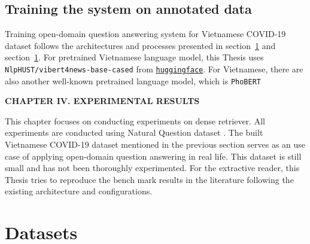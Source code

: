 \documentclass[3p, sort&compress, 12pt]{elsarticle}
\begin{document}
\subsection{Training the system on annotated data}
Training open-domain question answering system for Vietnamese COVID-19 dataset follows the architectures and processes presented in section~\ref{} and section~\ref{}. For pretrained Vietnamese language model, this Thesis uses {\tt NlpHUST/vibert4news-base-cased} from \href{https://huggingface.co/}{\tt huggingface}. For Vietnamese, there are also another well-known pretrained language model, which is {\tt PhoBERT} \cite{nguyen2020phobert}
\newpage
\begin{center}
	\fontsize{20}{\baselineskip}\selectfont\sf\bfseries CHAPTER IV. EXPERIMENTAL RESULTS
\end{center}
\label{chap:04}
This chapter focuses on conducting experiments on dense retriever. All experiments are conducted using Natural Question dataset \cite{kwiatkowski2019natural}. The built Vietnamese COVID-19 dataset mentioned in the previous section serves as an use case of applying open-domain question answering in real life. This dataset is still small and has not been thoroughly experimented. For the extractive reader, this Thesis tries to reproduce the bench mark results in the literature following the existing architecture and configurations. 
\setcounter{section}{0}
\section{Datasets}
\end{document}
